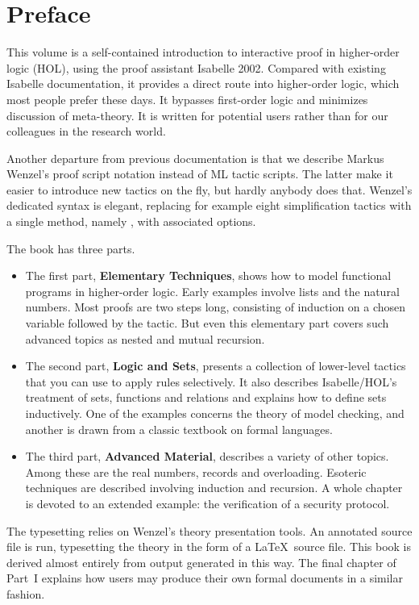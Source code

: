 \chapter*{Preface}

This volume is a self-contained introduction to interactive proof
in higher-order logic (HOL), using the proof assistant Isabelle 2002. 
Compared with existing Isabelle documentation,
it provides a direct route into higher-order logic, which most people
prefer these days. It bypasses first-order logic and minimizes
discussion of meta-theory.  It is written for potential users rather
than for our colleagues in the research world.

%
Another departure from previous documentation is that we describe Markus
Wenzel's proof script notation instead of ML tactic scripts.  The latter
make it easier to introduce new tactics on the fly, but hardly anybody
does that.  Wenzel's dedicated syntax is elegant, replacing for example
eight simplification tactics with a single method, namely ,
with associated options.

The book has three parts.  
\begin{itemize}
\item 
The first part, \textbf{Elementary Techniques},
shows how to model functional programs in higher-order logic.  Early
examples involve lists and the natural numbers.  Most proofs
are two steps long, consisting of induction on a chosen variable
followed by the  tactic.  But even this elementary part
covers such advanced topics as nested and mutual recursion.
\item 
The second part, \textbf{Logic and Sets}, presents a collection of
lower-level tactics that you can use to apply rules selectively.  It
also describes Isabelle/HOL's treatment of sets, functions and
relations and explains how to define sets inductively.  One of the
examples concerns the theory of model checking, and another is drawn
from a classic textbook on formal languages.
\item 
The third part, \textbf{Advanced Material}, describes a variety of
other topics.  Among these are the real numbers, records and
overloading.  Esoteric techniques are described involving induction and
recursion.  A whole chapter is devoted to an extended example: the
verification of a security protocol.
\end{itemize}

The typesetting relies on Wenzel's theory presentation tools.  An
annotated source file is run, typesetting the theory
in the form of a \LaTeX\ source file.  This book is derived almost entirely
from output generated in this way.  The final chapter of Part~I explains how
users may produce their own formal documents in a similar fashion.


